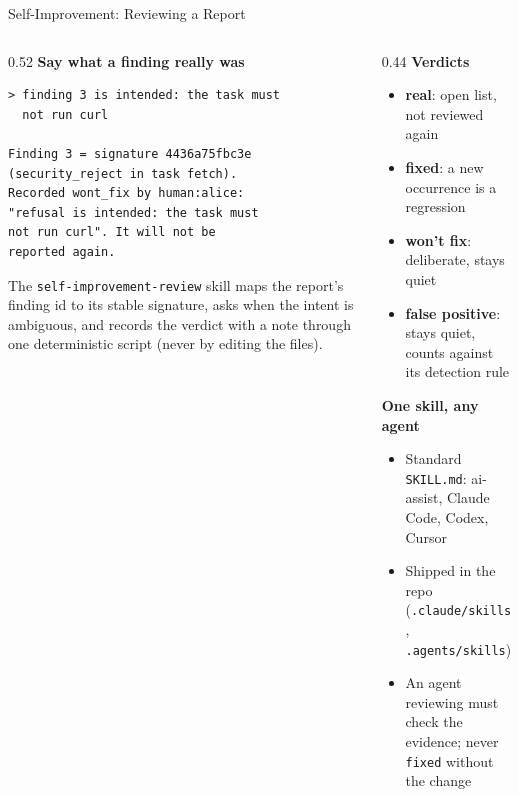 \documentclass[aspectratio=169,10pt]{beamer}
\begin{document}
\begin{frame}[fragile]{Self-Improvement: Reviewing a Report}
\begin{columns}[T]
\begin{column}{0.52\textwidth}
\textbf{Say what a finding really was}
\begin{lstlisting}[style=code,basicstyle=\ttfamily\tiny]
> finding 3 is intended: the task must
  not run curl

Finding 3 = signature 4436a75fbc3e
(security_reject in task fetch).
Recorded wont_fix by human:alice:
"refusal is intended: the task must
not run curl". It will not be
reported again.
\end{lstlisting}
\scriptsize
The \texttt{self-improvement-review} skill maps the report's finding id to its stable
signature, asks when the intent is ambiguous, and records the verdict with a note through
one deterministic script (never by editing the files).
\end{column}
\begin{column}{0.44\textwidth}
\textbf{Verdicts}
\begin{itemize}\scriptsize\setlength{\itemsep}{1pt}
  \item \textbf{real}: open list, not reviewed again
  \item \textbf{fixed}: a new occurrence is a \alert{regression}
  \item \textbf{won't fix}: deliberate, stays quiet
  \item \textbf{false positive}: stays quiet, counts against its detection rule
\end{itemize}

\smallskip
\textbf{One skill, any agent}
\begin{itemize}\scriptsize\setlength{\itemsep}{1pt}
  \item Standard \texttt{SKILL.md}: ai-assist, Claude Code, Codex, Cursor
  \item Shipped in the repo (\texttt{.claude/skills}, \texttt{.agents/skills})
  \item An agent reviewing must check the evidence; never \texttt{fixed} without the change
\end{itemize}
\end{column}
\end{columns}
\end{frame}
\end{document}
